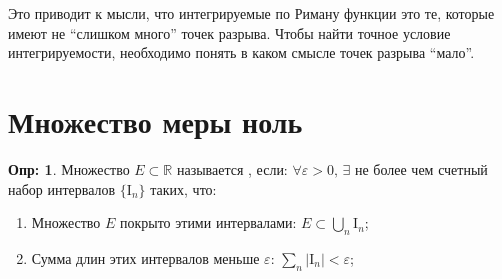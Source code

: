 \documentclass[12pt]{article}
\newcommand{\MR}{\mathbb{R}}
\newcommand{\MI}{\mathrm{I}}
\newcommand{\VE}{\varepsilon}
\theoremstyle{definition}
\newtheorem{defn}{Опр:}
\begin{document}
Это приводит к мысли, что интегрируемые по Риману функции это те, которые имеют не ``слишком много'' точек разрыва. Чтобы найти точное условие интегрируемости, необходимо понять в каком смысле точек разрыва ``мало''.

\section*{Множество меры ноль}
\begin{defn}
	Множество $E \subset \MR$ называется , если: $\forall \VE > 0, \, \exists$ не более чем счетный набор интервалов $\{\MI_n\}$ таких, что:
	\begin{enumerate}[label={(\arabic*)}]
		\item Множество $E$ покрыто этими интервалами: $E \subset \displaystyle \bigcup\limits_n \MI_n$;
		\item Сумма длин этих интервалов меньше $\VE$: $\displaystyle \sum\limits_{n} |\MI_n| < \VE$;
	\end{enumerate}
\end{defn}
\end{document}
